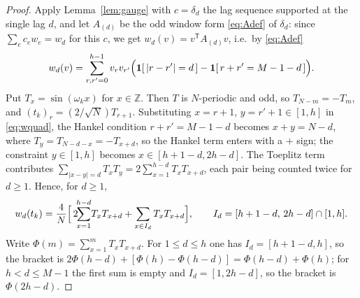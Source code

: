 \documentclass[11pt,a4paper]{article}
\theoremstyle{plain}
\theoremstyle{definition}
\newcommand{\Z}{\mathbb{Z}}
\newcommand{\T}{\mathsf{T}}
\begin{document}
\begin{proof}
Apply Lemma~\ref{lem:gauge} with $c=\delta_d$ the lag sequence supported at the
single lag $d$, and let $A_{(d)}$ be the odd window form \eqref{eq:Adef} of
$\delta_d$: since $\sum_ec_ew_e=w_d$ for this $c$, we get
$w_d(v)=v^{\T}A_{(d)}v$, i.e.\ by \eqref{eq:Adef}
\begin{equation}
\label{eq:wquad}
  w_d(v)=\sum_{r,r'=0}^{h-1}v_rv_{r'}
  \Bigl(\mathbf 1[\,|r-r'|=d\,]-\mathbf 1[\,r+r'=M-1-d\,]\Bigr).
\end{equation}
Put $T_x=\sin(\omega_kx)$ for $x\in\Z$. Then $T$ is $N$-periodic and odd, so
$T_{N-m}=-T_m$, and $(t_k)_r=(2/\sqrt N)T_{r+1}$. Substituting $x=r+1$,
$y=r'+1\in[1,h]$ in \eqref{eq:wquad}, the Hankel condition $r+r'=M-1-d$ becomes
$x+y=N-d$, where $T_y=T_{N-d-x}=-T_{x+d}$, so the Hankel term enters with a
$+$ sign; the constraint $y\in[1,h]$ becomes $x\in[h+1-d,2h-d]$. The Toeplitz
term contributes $\sum_{|x-y|=d}T_xT_y=2\sum_{x=1}^{h-d}T_xT_{x+d}$, each pair
being counted twice for $d\ge1$. Hence, for $d\ge1$,
\begin{equation}
\label{eq:twopartial}
  w_d(t_k)=\frac4N\Bigl[\,2\!\!\sum_{x=1}^{h-d}\!T_xT_{x+d}
  +\sum_{x\in I_d}T_xT_{x+d}\Bigr],
  \qquad
  I_d=[h+1-d,\,2h-d]\cap[1,h] .
\end{equation}
Write $\Phi(m)=\sum_{x=1}^{m}T_xT_{x+d}$. For $1\le d\le h$ one has
$I_d=[h+1-d,h]$, so the bracket is
$2\Phi(h-d)+[\Phi(h)-\Phi(h-d)]=\Phi(h-d)+\Phi(h)$; for $h<d\le M-1$ the first
sum is empty and $I_d=[1,2h-d]$, so the bracket is $\Phi(2h-d)$.


\end{proof}
\end{document}
